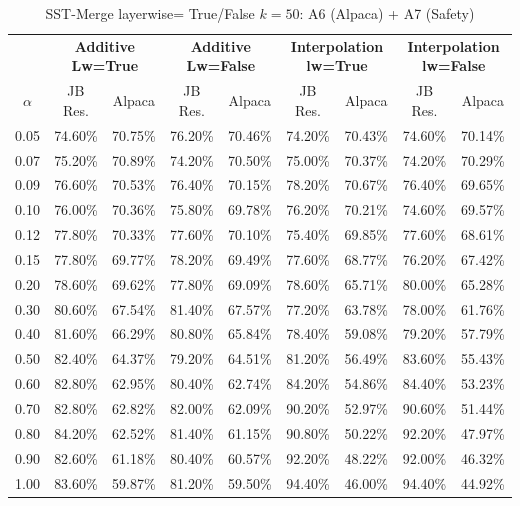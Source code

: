 \begin{table}[h]
\centering
\caption{SST-Merge layerwise= True/False $k=50$: A6 (Alpaca) + A7 (Safety)}
\label{tab:res_a6_a7_sst_50}
\begin{tabular}{c|cc|cc|cc|cc}
\hline
 & \multicolumn{2}{c|}{\textbf{Additive Lw=True}} & \multicolumn{2}{c|}{\textbf{Additive Lw=False}} & \multicolumn{2}{c|}{\textbf{Interpolation lw=True}}& \multicolumn{2}{c}{\textbf{Interpolation lw=False}} \\
$\alpha$ & JB Res. & Alpaca & JB Res. & Alpaca & JB Res. & Alpaca & JB Res. & Alpaca \\
\hline
0.05 & 74.60\% & 70.75\% & 76.20\% & 70.46\% & 74.20\% & 70.43\% & 74.60\% & 70.14\% \\
0.07 & 75.20\% & 70.89\% & 74.20\% & 70.50\% & 75.00\% & 70.37\% & 74.20\% & 70.29\% \\
0.09 & 76.60\% & 70.53\% & 76.40\% & 70.15\% & 78.20\% & 70.67\% & 76.40\% & 69.65\% \\
0.10 & 76.00\% & 70.36\% & 75.80\% & 69.78\% & 76.20\% & 70.21\% & 74.60\% & 69.57\% \\
0.12 & 77.80\% & 70.33\% & 77.60\% & 70.10\% & 75.40\% & 69.85\% & 77.60\% & 68.61\% \\
0.15 & 77.80\% & 69.77\% & 78.20\% & 69.49\% & 77.60\% & 68.77\% & 76.20\% & 67.42\% \\
0.20 & 78.60\% & 69.62\% & 77.80\% & 69.09\% & 78.60\% & 65.71\% & 80.00\% & 65.28\% \\
0.30 & 80.60\% & 67.54\% & 81.40\% & 67.57\% & 77.20\% & 63.78\% & 78.00\% & 61.76\% \\
0.40 & 81.60\% & 66.29\% & 80.80\% & 65.84\% & 78.40\% & 59.08\% & 79.20\% & 57.79\% \\
0.50 & 82.40\% & 64.37\% & 79.20\% & 64.51\% & 81.20\% & 56.49\% & 83.60\% & 55.43\% \\
0.60 & 82.80\% & 62.95\% & 80.40\% & 62.74\% & 84.20\% & 54.86\% & 84.40\% & 53.23\% \\
0.70 & 82.80\% & 62.82\% & 82.00\% & 62.09\% & 90.20\% & 52.97\% & 90.60\% & 51.44\% \\
0.80 & 84.20\% & 62.52\% & 81.40\% & 61.15\% & 90.80\% & 50.22\% & 92.20\% & 47.97\% \\
0.90 & 82.60\% & 61.18\% & 80.40\% & 60.57\% & 92.20\% & 48.22\% & 92.00\% & 46.32\% \\
1.00 & 83.60\% & 59.87\% & 81.20\% & 59.50\% & 94.40\% & 46.00\% & 94.40\% & 44.92\% \\
\hline
\end{tabular}
\end{table}
\FloatBarrier


